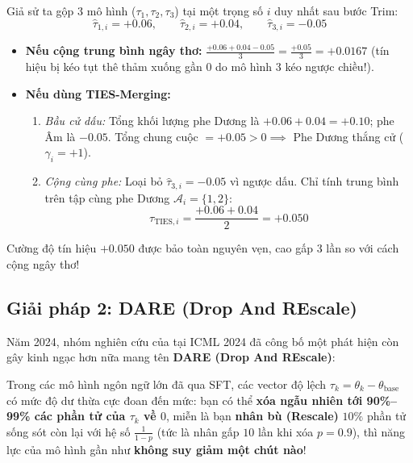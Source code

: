 \begin{mathdecode}
Giả sử ta gộp 3 mô hình ($\tau_1, \tau_2, \tau_3$) tại một trọng số $i$ duy nhất sau bước Trim:
\begin{equation*}
  \hat{\tau}_{1, i} = +0.06, \qquad \hat{\tau}_{2, i} = +0.04, \qquad \hat{\tau}_{3, i} = -0.05
\end{equation*}
\begin{itemize}
  \item \textbf{Nếu cộng trung bình ngây thơ:} $\frac{+0.06 + 0.04 - 0.05}{3} = \frac{+0.05}{3} = \mathbf{+0.0167}$ (tín hiệu bị kéo tụt thê thảm xuống gần $0$ do mô hình 3 kéo ngược chiều!).
  \item \textbf{Nếu dùng TIES-Merging:}
  \begin{enumerate}
    \item \textit{Bầu cử dấu:} Tổng khối lượng phe Dương là $+0.06 + 0.04 = +0.10$; phe Âm là $-0.05$. Tổng chung cuộc $= +0.05 > 0 \implies$ Phe Dương thắng cử ($\gamma_i = +1$).
    \item \textit{Cộng cùng phe:} Loại bỏ $\hat{\tau}_{3,i} = -0.05$ vì ngược dấu. Chỉ tính trung bình trên tập cùng phe Dương $\mathcal{A}_i = \{1, 2\}$:
    \begin{equation*}
      \tau_{\text{TIES}, i} = \frac{+0.06 + 0.04}{2} = \mathbf{+0.050}
    \end{equation*}
  \end{enumerate}
\end{itemize}
Cường độ tín hiệu $+0.050$ được bảo toàn nguyên vẹn, cao gấp 3 lần so với cách cộng ngây thơ!
\end{mathdecode}

\subsection{Giải pháp 2: DARE (Drop And REscale) \citep{yu2024language}}

Năm 2024, nhóm nghiên cứu của \citet{yu2024language} tại ICML 2024 đã công bố một phát hiện còn gây kinh ngạc hơn nữa mang tên \textbf{DARE (Drop And REscale)}:

Trong các mô hình ngôn ngữ lớn đã qua SFT, các vector độ lệch $\tau_k = \theta_k - \theta_{\text{base}}$ có mức độ dư thừa cực đoan đến mức: bạn có thể \textbf{xóa ngẫu nhiên tới 90\%--99\% các phần tử của $\tau_k$ về $0$}, miễn là bạn \textbf{nhân bù (Rescale)} $10\%$ phần tử sống sót còn lại với hệ số $\frac{1}{1 - p}$ (tức là nhân gấp $10$ lần khi xóa $p = 0.9$), thì năng lực của mô hình gần như \textbf{không suy giảm một chút nào}!

